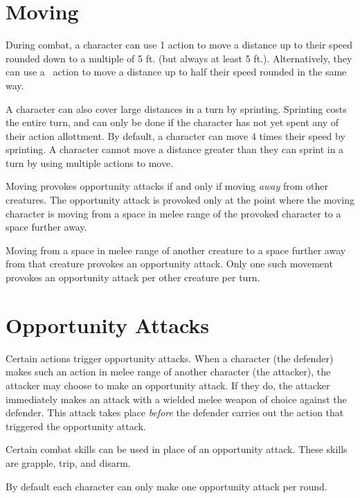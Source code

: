 \begin{multicols*}{2}
    \section{Moving}
    During combat, a character can use 1 action to move a distance up to their
    speed rounded down to a multiple of 5 ft. (but always at least 5 ft.).
    Alternatively, they can use a \textonehalf\ action to move a distance up
    to half their speed rounded in the same way.

    A character can also cover large distances in a turn by sprinting.
    Sprinting costs the entire turn, and can only be done if the character has
    not yet spent any of their action allottment. By default, a character can
    move 4 times their speed by sprinting. A character cannot move a distance
    greater than they can sprint in a turn by using multiple actions to move.

    Moving provokes opportunity attacks if and only if moving \textit{away}
    from other creatures. The opportunity attack is provoked only at the
    point where the moving character is moving from a space in melee range of
    the provoked character to a space further away.

    Moving from a space in melee range of another creature to a space further
    away from that creature provokes an opportunity attack. Only one such
    movement provokes an opportunity attack per other creature per turn.

    \section{Opportunity Attacks}
    Certain actions trigger opportunity attacks. When a character (the
    defender) makes such an action in melee range of another character (the
    attacker), the attacker may choose to make an opportunity attack. If they
    do, the attacker immediately makes an attack with a wielded melee weapon
    of choice against the defender. This attack takes place \textit{before}
    the defender carries out the action that triggered the opportunity attack.

    Certain combat skills can be used in place of an opportunity attack. These
    skills are grapple, trip, and disarm.

    By default each character can only make one opportunity attack per round.
\end{multicols*}

